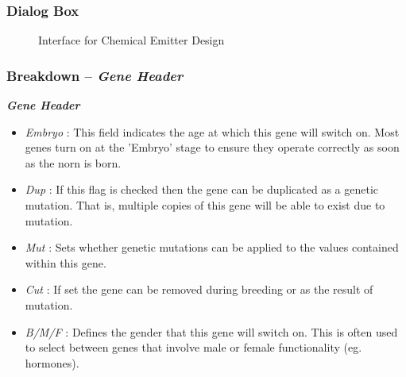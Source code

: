 \documentclass[11pt,twoside,a4paper]{article}
\begin{document}
\begin{minipage}{0.4\linewidth}
\subsubsection{Dialog Box}
\begin{figure}[H]
	\centerline {} %
	\caption{Interface for Chemical Emitter Design}
	\label{fig:chemical_emitter}
\end{figure}
\subsubsection{Breakdown -- \emph{Gene Header}}
\end{minipage}
\begin{minipage}{0.1\linewidth}\end{minipage}
\begin{minipage}{0.5\linewidth}
\textbf{\textit{Gene Header}}~\\
\begin{itemize}
	\item[] \emph{Embryo} : This field indicates the age at which this gene will switch on. Most genes turn on at the 'Embryo' stage to ensure they operate correctly as soon as the norn is born. 
	\item[] \emph{Dup} : If this flag is checked then the gene can be duplicated as a genetic mutation. That is, multiple copies of this gene will be able to exist due to mutation.
	\item[] \emph{Mut} : Sets whether genetic mutations can be applied to the values contained within this gene.
	\item[] \emph{Cut} : If set the gene can be removed during breeding or as the result of mutation. 
	\item[] \emph{B/M/F} : Defines the gender that this gene will switch on. This is often used to select between genes that involve male or female functionality (eg. hormones).
\end{itemize}
\end{minipage}~\\


\end{document}

